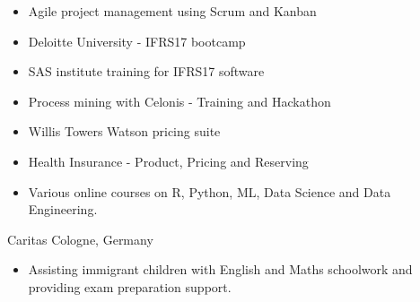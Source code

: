 \documentclass[a4paper,]{fortysecondscv}
\begin{document}

\begin{cvtable}
    \vspace{\topsep}
    \cvitemshortsingle
    {
        \begin{itemize}[nosep, leftmargin=12pt, label={-}, topsep=0pt]
            \item Agile project management using Scrum and Kanban
            \item Deloitte University - IFRS17 bootcamp
            \item SAS institute training for IFRS17 software
            \item Process mining with Celonis - Training and Hackathon
            \item Willis Towers Watson pricing suite
            \item Health Insurance - Product, Pricing and Reserving
            \item Various online courses on R, Python, ML, Data Science and Data Engineering.
        \end{itemize}
    }

\end{cvtable}


\begin{cvtable}[1.1]
    \vspace{\topsep}
    \cvitemoneblocksingle
    {Caritas}
    {Cologne, Germany}
    {
        \begin{itemize}[nosep, leftmargin=12pt, label={-}, topsep=0pt]\item Assisting immigrant children with English and Maths schoolwork and providing exam preparation support.
        \end{itemize}
    }
\end{cvtable}



\end{document}
